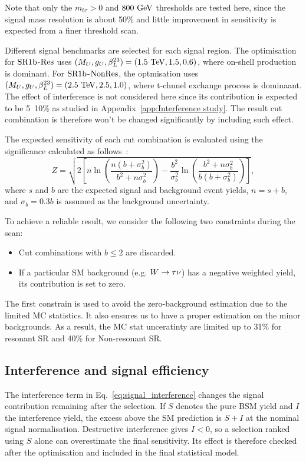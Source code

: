 Note that only the $m_{b\tau}>0$ and $800~\mathrm{GeV}$ thresholds are tested here, since the signal mass resolution is about 50\% and little improvement in sensitivity is expected from a finer threshold scan.

Different signal benchmarks are selected for each signal region. The optimisation for $\mathrm{SR1b}$-$\mathrm{Res}$ uses $(M_U,g_U,\beta_L^{23})=(1.5~\mathrm{TeV},1.5,0.6)$, where on-shell production is dominant.
For $\mathrm{SR1b}$-$\mathrm{NonRes}$, the optmisation uses $(M_U,g_U,\beta_L^{23})=(2.5~\mathrm{TeV},2.5,1.0)$, where t-chnnel exchange process is dominaant.
The effect of interference is not considered here since its contribution is expected to be 5~10\% as studied in Appendix~\ref{app:Interference study}. The result cut combination is therefore won't be changed significantly by including such effect.

The expected sensitivity of each cut combination is evaluated using the significance calculated as follows~\cite{ATL-PHYS-PUB-2020-025}:
\begin{equation}
    Z = \sqrt{2\left[n\ln\!\left(\frac{n(b+\sigma_b^2)}{b^2+n\sigma_b^2}\right)-\frac{b^2}{\sigma_b^2}\ln\!\left(\frac{b^2+n\sigma_b^2}{b(b+\sigma_b^2)}\right)\right]},
    \label{eq:ch7_optimisation_significance}
\end{equation}
where $s$ and $b$ are the expected signal and background event yields, $n=s+b$, and $\sigma_b=0.3b$ is assumed as the background uncertainty.

To achieve a reliable result, we consider the following two constraints during the scan:
\begin{itemize}
    \item Cut combinations with $b\leq2$ are discarded.
    \item If a particular SM background (e.g. $W\rightarrow\tau\nu$) has a negative weighted yield, its contribution is set to zero.
\end{itemize}
The first constrain is used to avoid the zero-background estimation due to the limited MC statistics. It also ensures us to have a proper estimation on the minor backgrounds. As a result, the MC stat unceratinty are limited up to 31\% for resonant SR and 40\% for Non-resonant SR.

\subsection{Interference and signal efficiency}
\label{subsec:ch7_efficiency}

The interference term in Eq.~\ref{eq:signal_interference} changes the signal contribution remaining after the selection.
If $S$ denotes the pure BSM yield and $I$ the interference yield, the excess above the SM prediction is $S+I$ at the nominal signal normalisation.
Destructive interference gives $I<0$, so a selection ranked using $S$ alone can overestimate the final sensitivity.
Its effect is therefore checked after the optimisation and included in the final statistical model.

